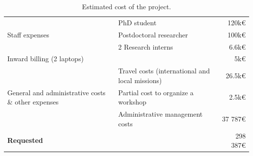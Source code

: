 \documentclass[a4paper,11pt]{article}
\begin{document}
\begin{table}[h]
	\begin{center}
		\begin{tabular}{p{3.8cm}p{8.25cm}r}
			\toprule
			\multirow{3}{3.8cm}{Staff expenses}  & PhD student &   120k\euro \\\cline{2-3}
			& Postdoctoral researcher  &100k\euro \\ \cline{2-3}
			& 2 Research interns  & 6.6k\euro \\\hline
			\multicolumn{2}{p{7cm}}{Inward billing (2 laptops)}    &    5k\euro \\\hline
			\multirow{3}{3.8cm}{General and administrative costs \& other
				 expenses}  & Travel costs (international and local missions)  &  26.5k\euro \\\cline{2-3}
			& Partial cost to organize a workshop  &  2.5k\euro \\\cline{2-3}
			& Administrative management costs& 37 787\euro \\\midrule
			\multicolumn{2}{l}{\bf Requested} &\multicolumn{1}{r}{298 387\euro} \\
			\bottomrule
		\end{tabular}
	\end{center}
	\vspace*{-0.45cm}\caption{Estimated cost of the project.\vspace*{-0.25cm}}
	\label{tab:costs}
\end{table}
\end{document}
